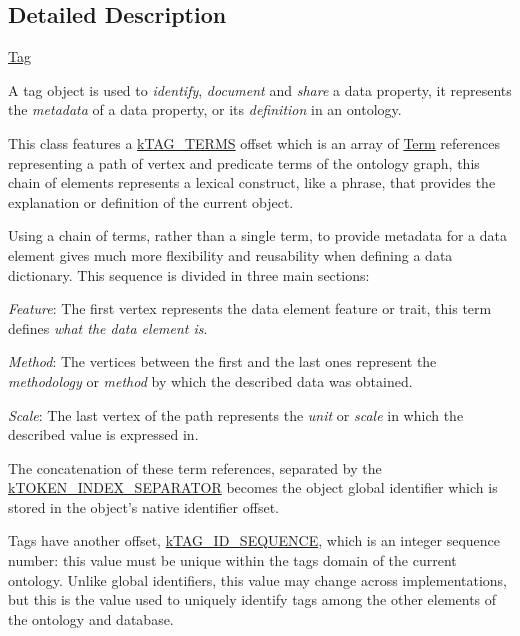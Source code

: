 \subsection{Detailed Description}
\hyperlink{class_ontology_wrapper_1_1_tag}{Tag}

A tag object is used to {\itshape identify}, {\itshape document} and {\itshape share} a data property, it represents the {\itshape metadata} of a data property, or its {\itshape definition} in an ontology.

This class features a \hyperlink{}{k\-T\-A\-G\-\_\-\-T\-E\-R\-M\-S} offset which is an array of \hyperlink{class_ontology_wrapper_1_1_term}{Term} references representing a path of vertex and predicate terms of the ontology graph, this chain of elements represents a lexical construct, like a phrase, that provides the explanation or definition of the current object.

Using a chain of terms, rather than a single term, to provide metadata for a data element gives much more flexibility and reusability when defining a data dictionary. This sequence is divided in three main sections\-:


\begin{DoxyItemize}
\item {\itshape Feature}\-: The first vertex represents the data element feature or trait, this term defines {\itshape what the data element is}. 
\item {\itshape Method}\-: The vertices between the first and the last ones represent the {\itshape methodology} or {\itshape method} by which the described data was obtained. 
\item {\itshape Scale}\-: The last vertex of the path represents the {\itshape unit} or {\itshape scale} in which the described value is expressed in. 
\end{DoxyItemize}

The concatenation of these term references, separated by the \hyperlink{}{k\-T\-O\-K\-E\-N\-\_\-\-I\-N\-D\-E\-X\-\_\-\-S\-E\-P\-A\-R\-A\-T\-O\-R} becomes the object global identifier which is stored in the object's native identifier offset.

Tags have another offset, \hyperlink{}{k\-T\-A\-G\-\_\-\-I\-D\-\_\-\-S\-E\-Q\-U\-E\-N\-C\-E}, which is an integer sequence number\-: this value must be unique within the tags domain of the current ontology. Unlike global identifiers, this value may change across implementations, but this is the value used to uniquely identify tags among the other elements of the ontology and database.

